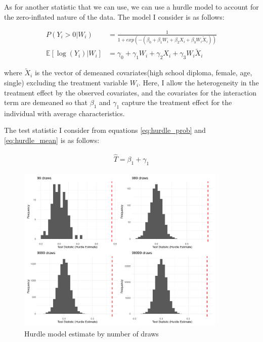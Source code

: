\documentclass[11pt]{article}
\numberwithin{equation}{section}
\begin{document}
As for another statistic that we can use, we can use a hurdle model to account for the zero-inflated nature of the data.
The model I consider is as follows:

\begin{align}
P(Y_i > 0| W_i) &= \frac{1}{1+exp(-(\beta_0 + \beta_1 W_i + \beta_2 X_i + \beta_3 W_i \tilde{X}_i))} \label{eq:hurdle_prob}\\
\mathbb{E}\left[\log(Y_i)| W_i\right] &= \gamma_0 + \gamma_1 W_i + \gamma_2 X_i + \gamma_3 W_i \tilde{X}_i \label{eq:hurdle_mean}
\end{align}

where $\tilde{X}_i$ is the vector of demeaned covariates(high school diploma, female, age, single) excluding the treatment variable $W_i$.
Here, I allow the heterogeneity in the treatment effect by the observed covariates, and the covariates for the interaction term are demeaned so that $\beta_1$ and $\gamma_1$ capture the treatment effect for the individual with average characteristics.

The test statistic I consider from equations \ref{eq:hurdle_prob} and \ref{eq:hurdle_mean} is as follows:

\begin{align}
\hat{T} = \beta_1 + \gamma_1 \label{eq:hurdle}
\end{align}


\begin{figure}[ht]
    \centering
    \includegraphics[width=\textwidth, height=8cm]{output/histograms_hurdle_model_estimate.png}
    \caption{\label{fig:hurdle}Hurdle model estimate by number of draws}
\end{figure}
\end{document}
